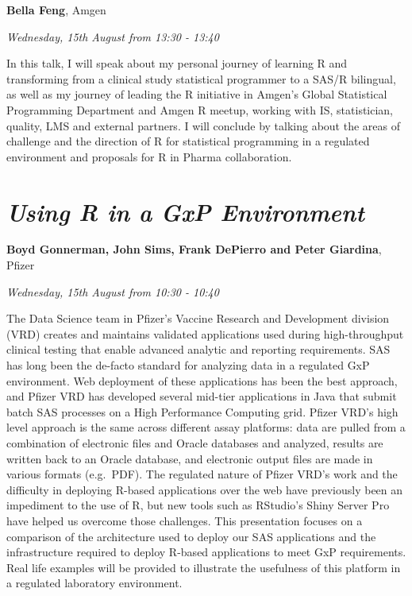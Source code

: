 \documentclass[]{book}
\theoremstyle{definition}
\theoremstyle{definition}
\theoremstyle{definition}
\theoremstyle{remark}
\begin{document}
\textbf{Bella Feng}, Amgen

\emph{Wednesday, 15th August from 13:30 - 13:40}

In this talk, I will speak about my personal journey of learning R and
transforming from a clinical study statistical programmer to a SAS/R
bilingual, as well as my journey of leading the R initiative in Amgen's
Global Statistical Programming Department and Amgen R meetup, working
with IS, statistician, quality, LMS and external partners. I will
conclude by talking about the areas of challenge and the direction of R
for statistical programming in a regulated environment and proposals for
R in Pharma collaboration.

\hypertarget{using-r-in-a-gxp-environment}{%
\section{\texorpdfstring{\emph{Using R in a GxP
Environment}}{Using R in a GxP Environment}}\label{using-r-in-a-gxp-environment}}

\textbf{Boyd Gonnerman, John Sims, Frank DePierro and Peter Giardina},
Pfizer

\emph{Wednesday, 15th August from 10:30 - 10:40}

The Data Science team in Pfizer's Vaccine Research and Development
division (VRD) creates and maintains validated applications used during
high-throughput clinical testing that enable advanced analytic and
reporting requirements. SAS has long been the de-facto standard for
analyzing data in a regulated GxP environment. Web deployment of these
applications has been the best approach, and Pfizer VRD has developed
several mid-tier applications in Java that submit batch SAS processes on
a High Performance Computing grid. Pfizer VRD's high level approach is
the same across different assay platforms: data are pulled from a
combination of electronic files and Oracle databases and analyzed,
results are written back to an Oracle database, and electronic output
files are made in various formats (e.g.~PDF). The regulated nature of
Pfizer VRD's work and the difficulty in deploying R-based applications
over the web have previously been an impediment to the use of R, but new
tools such as RStudio's Shiny Server Pro have helped us overcome those
challenges. This presentation focuses on a comparison of the
architecture used to deploy our SAS applications and the infrastructure
required to deploy R-based applications to meet GxP requirements. Real
life examples will be provided to illustrate the usefulness of this
platform in a regulated laboratory environment.
\end{document}
